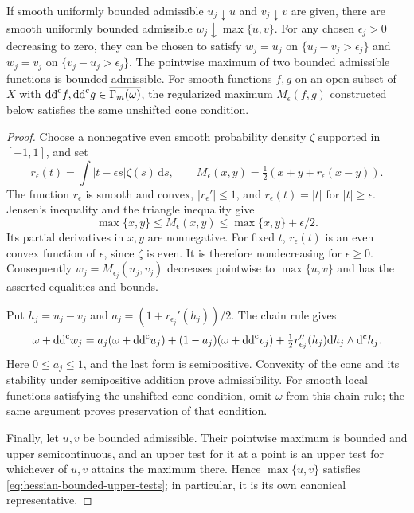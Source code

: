 \begin{lemma}\label{hessian:regularized-maximum}
If smooth uniformly bounded admissible $u_j\downarrow u$ and
$v_j\downarrow v$ are given, there are smooth uniformly bounded
admissible $w_j\downarrow\max\{u,v\}$. For any chosen
$\epsilon_j>0$ decreasing to zero, they can be chosen to satisfy
$w_j=u_j$ on $\{u_j-v_j>\epsilon_j\}$ and
$w_j=v_j$ on $\{v_j-u_j>\epsilon_j\}$.
The pointwise maximum of two bounded admissible functions is bounded
admissible. For smooth functions $f,g$ on an open subset of $X$ with
$\mathrm{dd}^{\mathrm{c}} f,\mathrm{dd}^{\mathrm{c}} g\in\overline{\Gamma_m(\omega)}$, the regularized
maximum $M_\epsilon(f,g)$ constructed below satisfies the same
unshifted cone condition.
\end{lemma}
\begin{proof}
Choose a nonnegative even smooth probability density $\zeta$
supported in $[-1,1]$, and set
\[
 r_\epsilon(t)=\int |t-\epsilon s|\zeta(s)\,\mathrm ds,
 \qquad M_\epsilon(x,y)=\tfrac12(x+y+r_\epsilon(x-y)).
\]
The function $r_\epsilon$ is smooth and convex,
$|r_\epsilon'|\leq1$, and $r_\epsilon(t)=|t|$ for
$|t|\geq\epsilon$. Jensen's inequality and the triangle inequality
give
\[
 \max\{x,y\}\leq M_\epsilon(x,y)
                     \leq\max\{x,y\}+\epsilon/2.
\]
Its partial derivatives in $x,y$ are nonnegative. For fixed $t$,
$r_\epsilon(t)$ is an even convex function of $\epsilon$, since
$\zeta$ is even. It is therefore nondecreasing for $\epsilon\geq0$.
Consequently $w_j=M_{\epsilon_j}(u_j,v_j)$ decreases pointwise to
$\max\{u,v\}$ and has the asserted equalities and bounds.

Put $h_j=u_j-v_j$ and
$a_j=(1+r_{\epsilon_j}'(h_j))/2$. The chain rule gives
\[
 \omega+\mathrm{dd}^{\mathrm{c}} w_j
 =a_j(\omega+\mathrm{dd}^{\mathrm{c}} u_j)+(1-a_j)(\omega+\mathrm{dd}^{\mathrm{c}} v_j)
       +\tfrac12r_{\epsilon_j}''(h_j)
                    \mathrm dh_j\wedge\mathrm d^{\mathrm c} h_j.
\]
Here $0\leq a_j\leq1$, and the last form is semipositive.
Convexity of the cone and its stability under semipositive addition
prove admissibility. For smooth local functions satisfying the unshifted
cone condition, omit $\omega$ from this chain rule; the same argument
proves preservation of that condition.

Finally, let $u,v$ be bounded admissible. Their pointwise maximum is
bounded and upper semicontinuous, and an upper test for it at a point
is an upper test for whichever of $u,v$ attains the maximum there.
Hence $\max\{u,v\}$ satisfies \eqref{eq:hessian-bounded-upper-tests};
in particular, it is its own canonical representative.
\end{proof}


